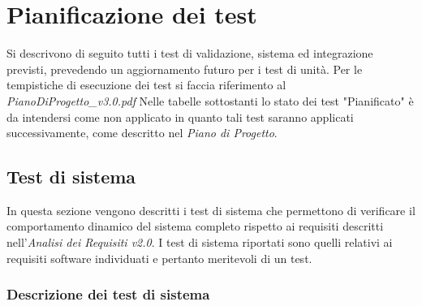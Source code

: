 \newcommand{\teststatus}{Pianificato}

\section {Pianificazione dei test}

Si descrivono di seguito tutti i test di validazione, sistema ed integrazione previsti, prevedendo un aggiornamento futuro per i test di unità. Per le tempistiche di esecuzione dei test si faccia riferimento al \textit{PianoDiProgetto_v3.0.pdf} Nelle tabelle sottostanti lo stato dei test "Pianificato" è da intendersi come non applicato in quanto tali test saranno applicati successivamente, come descritto nel \textit{Piano di Progetto}.

\subsection {Test di sistema}

In questa sezione vengono descritti i test di sistema che permettono di verificare il comportamento dinamico del sistema completo rispetto ai requisiti descritti nell'\textit{Analisi dei Requisiti v2.0}.
I test di sistema riportati sono quelli relativi ai requisiti software individuati e pertanto meritevoli di un test.

\subsubsection{Descrizione dei test di sistema}

